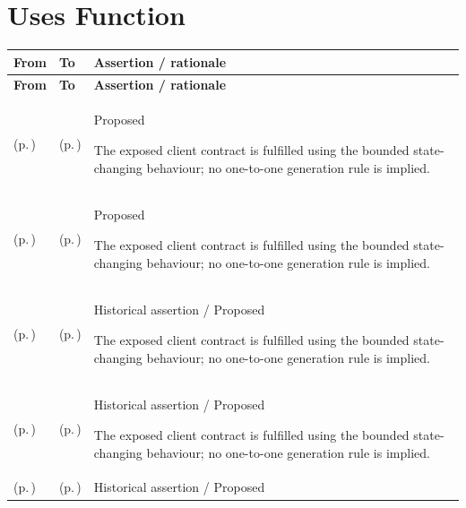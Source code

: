 \section{Uses Function}
\begingroup\small\setlength{\TableWidth}{\dimexpr\linewidth-6\tabcolsep-4\arrayrulewidth\relax}
\begin{longtable}{|>{\raggedright\arraybackslash}p{0.27\TableWidth}|>{\raggedright\arraybackslash}p{0.27\TableWidth}|>{\raggedright\arraybackslash}p{0.46\TableWidth}|}
\hline\rowcolor{TableHead}\textbf{From} & \textbf{To} & \textbf{Assertion / rationale}\\\hline\endfirsthead
\hline\rowcolor{TableHead}\textbf{From} & \textbf{To} & \textbf{Assertion / rationale}\\\hline\endhead
\hline\endfoot
\nameref{service:associated-binary-content-retrieval} (p.\,\pageref{service:associated-binary-content-retrieval}) & \nameref{function:resolve-associated-binary-content} (p.\,\pageref{function:resolve-associated-binary-content}) & Proposed

The exposed client contract is fulfilled using the bounded state-changing behaviour; no one-to-one generation rule is implied.\\\hline
\nameref{service:associated-binary-content-retrieval} (p.\,\pageref{service:associated-binary-content-retrieval}) & \nameref{function:assemble-associated-binary-content} (p.\,\pageref{function:assemble-associated-binary-content}) & Proposed

The exposed client contract is fulfilled using the bounded state-changing behaviour; no one-to-one generation rule is implied.\\\hline
\nameref{service:mandatory-audit-evidence-capture} (p.\,\pageref{service:mandatory-audit-evidence-capture}) & \nameref{function:capture-required-significant-audit-evidence} (p.\,\pageref{function:capture-required-significant-audit-evidence}) & Historical assertion / Proposed

The exposed client contract is fulfilled using the bounded state-changing behaviour; no one-to-one generation rule is implied.\\\hline
\nameref{service:entity-operational-input-submission} (p.\,\pageref{service:entity-operational-input-submission}) & \nameref{function:coordinate-entity-relative-input} (p.\,\pageref{function:coordinate-entity-relative-input}) & Historical assertion / Proposed

The exposed client contract is fulfilled using the bounded state-changing behaviour; no one-to-one generation rule is implied.\\\hline
\nameref{service:service-offering-readiness-query} (p.\,\pageref{service:service-offering-readiness-query}) & \nameref{function:assess-service-offering-readiness} (p.\,\pageref{function:assess-service-offering-readiness}) & Historical assertion / Proposed


\end{longtable}
